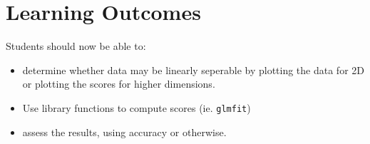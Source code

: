 \documentclass[12pt]{book}
\begin{document}
\section*{Learning Outcomes}
Students should now be able to:
\begin{itemize}
        \item determine whether data may be linearly seperable by plotting
                the data for 2D or plotting the scores for higher 
                dimensions.
        \item Use library functions to compute scores 
                (ie. \texttt{glmfit})
        \item assess the results, using accuracy or otherwise.
\end{itemize}
\end{document}
